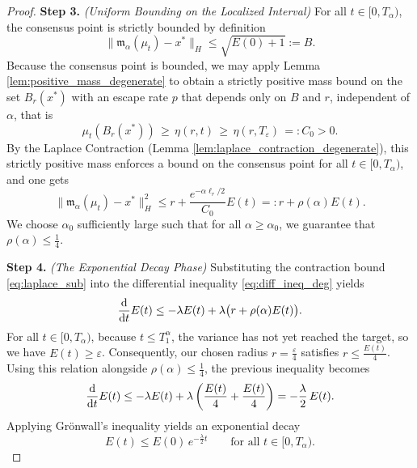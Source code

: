 \documentclass[12pt]{amsart}
\newcommand{\D}[1]{\mbox{\rm #1}}
\newcommand{\dd}{\D{d}}
\numberwithin{equation}{section}
\begin{document}
\begin{proof}
\textbf{Step 3.} \textit{(Uniform Bounding on the Localized Interval)} 
For all $t \in [0, T_\alpha)$, the consensus point is strictly bounded by definition
\[
    \|\mathfrak{m}_{\alpha}(\mu_t) - x^*\|_H \leq \sqrt{E(0) + 1} := B.
\]
Because the consensus point is bounded, we may apply Lemma \ref{lem:positive_mass_degenerate} to obtain a strictly positive mass bound on the  set $B_r(x^*)$ with an escape rate $p$ that depends only on $B$ and $r$, independent of $\alpha$, that is
\begin{equation*}
    \mu_t(B_r(x^*)) \,\geq\, \eta(r, t) \,\geq\, \eta(r, T_\varepsilon)\, =: C_0 > 0.
\end{equation*}
By the Laplace Contraction (Lemma \ref{lem:laplace_contraction_degenerate}), this strictly positive mass enforces a bound on the consensus point for all $t \in [0, T_\alpha)$, and one gets
\begin{equation} \label{eq:laplace_sub}
    \|\mathfrak{m}_{\alpha}(\mu_t) - x^*\|_H^2 \leq r + \frac{e^{-\alpha \ell_r / 2}}{C_0} E(t) =: r + \rho(\alpha) E(t).
\end{equation}
We choose $\alpha_0$ sufficiently large such that for all $\alpha \geq \alpha_0$, we guarantee that $\rho(\alpha) \leq \frac{1}{4}$.

\textbf{Step 4.} \textit{(The Exponential Decay Phase)} 
Substituting the contraction bound \eqref{eq:laplace_sub} into the differential inequality \eqref{eq:diff_ineq_deg} yields
\begin{equation*}
    \frac{\dd}{\dd t} E(t) \leq -\lambda E(t) + \lambda \big( r + \rho(\alpha) E(t) \big).
\end{equation*}
For all $t \in [0, T_\alpha)$, because $t \leq T^\alpha_1$, the variance has not yet reached the target, so we have $E(t) \geq \varepsilon$. Consequently, our chosen radius $r = \frac{\varepsilon}{4}$  satisfies $r \leq \frac{E(t)}{4}$. Using this relation alongside $\rho(\alpha) \leq \frac{1}{4}$, the previous inequality becomes
\begin{equation*}
    \frac{\dd}{\dd t} E(t) \leq -\lambda E(t) + \lambda \left( \frac{E(t)}{4} + \frac{E(t)}{4} \right) = -\frac{\lambda}{2} \, E(t).
\end{equation*}
Applying Gr\"onwall's inequality yields an exponential decay
\begin{equation} \label{eq:gronwall_strict}
    E(t) \leq E(0) \, e^{-\frac{\lambda}{2} t} \qquad \text{for all } t \in [0, T_\alpha).
\end{equation}


\end{proof}
\end{document}
